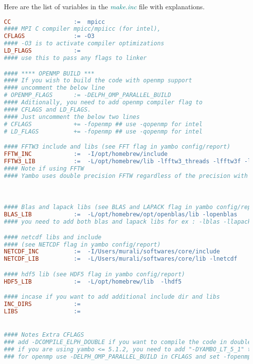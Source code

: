 \documentclass[12pt,twoside,openany]{book}
\begin{document}
Here are the list of variables in the {\textcolor{teal}{\emph{make.inc}}} file with 
explanations.
\begin{lstlisting}[language=make]
CC                  :=  mpicc
#### MPI C compiler mpicc/mpiicc (for intel), 
CFLAGS              := -O3
#### -O3 is to activate compiler optimizations
LD_FLAGS            := 
#### use this to pass any flags to linker

#### **** OPENMP BUILD ***
#### If you wish to build the code with openmp support
#### uncomment the below line 
# OPENMP_FLAGS   	:= -DELPH_OMP_PARALLEL_BUILD 
#### Aditionally, you need to add openmp compiler flag to 
#### CFLAGS and LD_FLAGS.
#### Just uncomment the below two lines
# CFLAGS            += -fopenmp ## use -qopenmp for intel
# LD_FLAGS          += -fopenmp ## use -qopenmp for intel

#### FFTW3 include and libs (see FFT flag in yambo config/report)
FFTW_INC 	        :=  -I/opt/homebrew/include 
FFTW3_LIB           :=  -L/opt/homebrew/lib -lfftw3_threads -lfftw3f -lfftw3f_omp -lfftw3_omp -lfftw3
#### Note if using FFTW
#### Yambo uses double precision FFTW regardless of the precision with which Yambo is built. In contrast, you need to link single (double) precision FFTW for single (double) precision LetzElPhC. please refer to https://www.fftw.org/fftw3_doc/Precision.html . Also you refer to https://www.fftw.org/fftw3_doc/Multi_002dthreaded-FFTW.html  if compiling with openmp support.



#### Blas and lapack libs (see BLAS and LAPACK flag in yambo config/report)
BLAS_LIB 	        :=  -L/opt/homebrew/opt/openblas/lib -lopenblas 
#### you need to add both blas and lapack libs for ex : -lblas -llapack

#### netcdf libs and include
#### (see NETCDF flag in yambo config/report)
NETCDF_INC          :=  -I/Users/murali/softwares/core/include 
NETCDF_LIB 	        :=  -L/Users/murali/softwares/core/lib -lnetcdf

#### hdf5 lib (see HDF5 flag in yambo config/report)
HDF5_LIB            :=  -L/opt/homebrew/lib  -lhdf5

#### incase if you want to add additional include dir and libs
INC_DIRS            := 
LIBS                := 


#### Notes Extra CFLAGS
### add -DCOMPILE_ELPH_DOUBLE if you want to compile the code in double precession
### if you are using yambo <= 5.1.2, you need to add "-DYAMBO_LT_5_1" to cflags
### for openmp use -DELPH_OMP_PARALLEL_BUILD in CFLAGS and set -fopenmp in LD_FLAGS and CFLAGS
\end{lstlisting}
%
%
%
\end{document}
